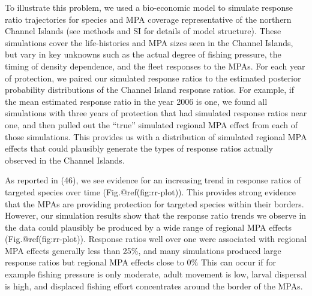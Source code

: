 \documentclass[9pt,twocolumn,twoside,lineno]{pnas-new}
\begin{document}
To illustrate this problem, we used a bio-economic model to simulate
response ratio trajectories for species and MPA coverage representative
of the northern Channel Islands (see methods and SI for details of model
structure). These simulations cover the life-histories and MPA sizes
seen in the Channel Islands, but vary in key unknowns such as the actual
degree of fishing pressure, the timing of density dependence, and the
fleet responses to the MPAs. For each year of protection, we paired our
simulated response ratios to the estimated posterior probability
distributions of the Channel Island response ratios. For example, if the
mean estimated response ratio in the year 2006 is one, we found all
simulations with three years of protection that had simulated response
ratios near one, and then pulled out the ``true'' simulated regional MPA
effect from each of those simulations. This provides us with a
distribution of simulated regional MPA effects that could plausibly
generate the types of response ratios actually observed in the Channel
Islands.

As reported in (46), we see evidence for an increasing trend in response
ratios of targeted species over time (Fig.@ref(fig:rr-plot)). This
provides strong evidence that the MPAs are providing protection for
targeted species within their borders. However, our simulation results
show that the response ratio trends we observe in the data could
plausibly be produced by a wide range of regional MPA effects
(Fig.@ref(fig:rr-plot)). Response ratios well over one were associated
with regional MPA effects generally less than 25\%, and many simulations
produced large response ratios but regional MPA effects close to 0\%
This can occur if for example fishing pressure is only moderate, adult
movement is low, larval dispersal is high, and displaced fishing effort
concentrates around the border of the MPAs.
\end{document}

